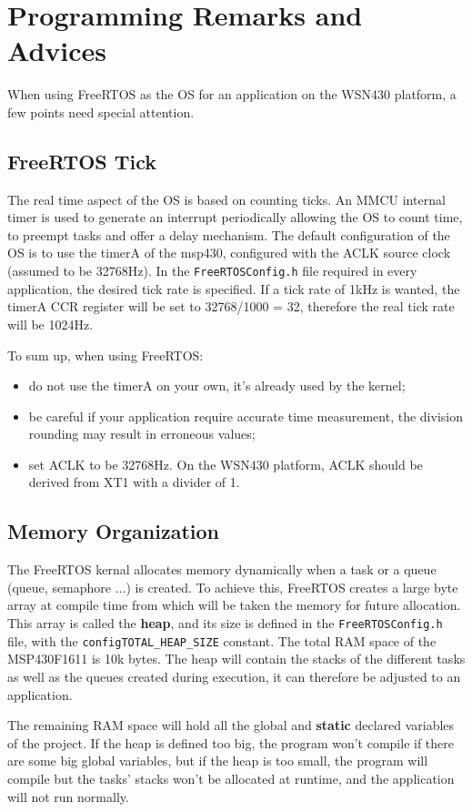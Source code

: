 \documentclass[11pt]{report}
\begin{document}
\section{Programming Remarks and Advices}
When using FreeRTOS as the OS for an application on the WSN430 platform, a few points need special attention.

\subsection{FreeRTOS Tick}
The real time aspect of the OS is based on counting ticks. An MMCU internal timer is used to generate an interrupt periodically allowing the OS to count time, to preempt tasks and offer a delay mechanism. The default configuration of the OS is to use the timerA of the msp430, configured with the ACLK source clock (assumed to be 32768Hz). In the \verb$FreeRTOSConfig.h$ file required in every application, the desired tick rate is specified. If a tick rate of 1kHz is wanted, the timerA CCR register will be set to 32768/1000 = 32, therefore the real tick rate will be 1024Hz.

To sum up, when using FreeRTOS:
\begin{itemize}
	\item do not use the timerA on your own, it's already used by the kernel;
	\item be careful if your application require accurate time measurement, the division rounding may result in erroneous values;
	\item set ACLK to be 32768Hz. On the WSN430 platform, ACLK should be derived from XT1 with a divider of 1.
\end{itemize}

\subsection{Memory Organization}
The FreeRTOS kernal allocates memory dynamically when a task or a queue (queue, semaphore ...) is created. To achieve this, FreeRTOS creates a large byte array at compile time from which will be taken the memory for future allocation. This array is called the \textbf{heap}, and its size is defined in the \verb$FreeRTOSConfig.h$ file, with the \verb$configTOTAL_HEAP_SIZE$ constant. The total RAM space of the MSP430F1611 is 10k bytes. The heap will contain the stacks of the different tasks as well as the queues created during execution, it can therefore be adjusted to an application.

The remaining RAM space will hold all the global and \textbf{static} declared variables of the project. If the heap is defined too big, the program won't compile if there are some big global variables, but if the heap is too small, the program will compile but the tasks' stacks won't be allocated at runtime, and the application will not run normally.
\end{document}
